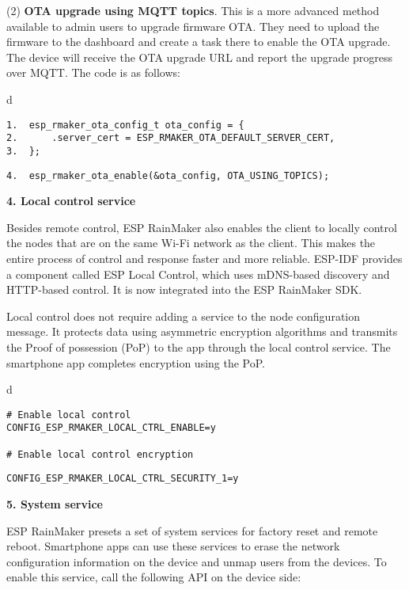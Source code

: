 \documentclass[a4paper,12pt]{book}
\begin{document}
\vspace{6pt}
(2) \textbf{OTA upgrade using MQTT topics}. This is a more advanced method available to admin users to upgrade firmware OTA. They need to upload the firmware to the dashboard and create a task there to enable the OTA upgrade. The device will receive the OTA upgrade URL and report the upgrade progress over MQTT. The code is as follows:

\begin{codebloc}
\begin{tabular}{d}
\vspace{2pt}
\begin{verbatim}
1.  esp_rmaker_ota_config_t ota_config = {
2.      .server_cert = ESP_RMAKER_OTA_DEFAULT_SERVER_CERT,
3.  };
\end{verbatim}
\verb|4.  esp_rmaker_ota_enable(&ota_config, OTA_USING_TOPICS);|
\end{tabular}
\end{codebloc}

\textbf{4.	Local control service}

Besides remote control, ESP RainMaker also enables the client to locally control the nodes that are on the same Wi-Fi network as the client. This makes the entire process of control and response faster and more reliable. ESP-IDF provides a component called ESP Local Control, which uses mDNS-based discovery and HTTP-based control. It is now integrated into the ESP RainMaker SDK. 

Local control does not require adding a service to the node configuration message. It protects data using asymmetric encryption algorithms and transmits the Proof of possession (PoP) to the app through the local control service. The smartphone app completes encryption using the PoP.

\begin{codebloc}
\begin{tabular}{d}
\vspace{2pt}
\begin{verbatim}
# Enable local control
CONFIG_ESP_RMAKER_LOCAL_CTRL_ENABLE=y

# Enable local control encryption
\end{verbatim}
\verb|CONFIG_ESP_RMAKER_LOCAL_CTRL_SECURITY_1=y|
\end{tabular}
\end{codebloc}

\textbf{5.	System service}

ESP RainMaker presets a set of system services for factory reset and remote reboot. Smartphone apps can use these services to erase the network configuration information on the device and unmap users from the devices. To enable this service, call the following API on the device side:
\end{document}

